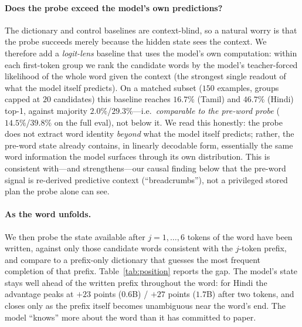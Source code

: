 \paragraph{Does the probe exceed the model's own predictions?} The dictionary
and control baselines are context-blind, so a natural worry is that the probe
succeeds merely because the hidden state sees the context. We therefore add a
\emph{logit-lens} baseline that uses the model's own computation: within each
first-token group we rank the candidate words by the model's teacher-forced
likelihood of the whole word given the context (the strongest single readout of
what the model itself predicts). On a matched subset ($150$ examples, groups
capped at $20$ candidates) this baseline reaches $16.7\%$ (Tamil) and $46.7\%$
(Hindi) top-1, against majority $2.0\%$/$29.3\%$---i.e.\ \emph{comparable to the
pre-word probe} ($14.5\%$/$39.8\%$ on the full eval), not below it. We read this
honestly: the probe does not extract word identity \emph{beyond} what the model
itself predicts; rather, the pre-word state already contains, in linearly
decodable form, essentially the same word information the model surfaces through
its own distribution. This is consistent with---and strengthens---our causal
finding below that the pre-word signal is re-derived predictive context
(``breadcrumbs''), not a privileged stored plan the probe alone can see.

\paragraph{As the word unfolds.} We then probe the state available after
$j=1,\dots,6$ tokens of the word have been written, against only those
candidate words consistent with the $j$-token prefix, and compare to a
prefix-only dictionary that guesses the most frequent completion of that
prefix. Table~\ref{tab:position} reports the gap. The model's state stays well
ahead of the written prefix throughout the word: for Hindi the advantage peaks
at $+23$ points ($0.6$B) / $+27$ points ($1.7$B) after two tokens, and closes
only as the prefix itself becomes unambiguous near the word's end. The model
``knows'' more about the word than it has committed to paper.

